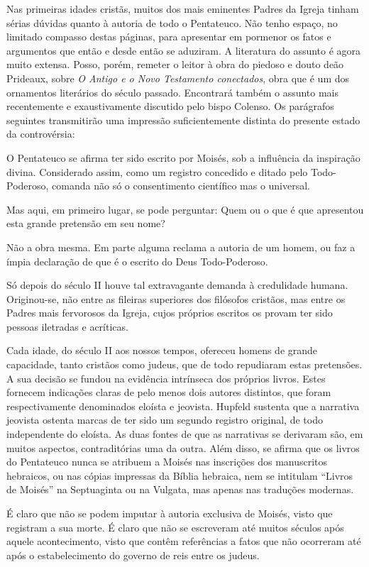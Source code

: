 \documentclass[11pt,a5paper,twoside,openany]{book}
\begin{document}
Nas primeiras idades cristãs, muitos dos mais eminentes Padres da Igreja tinham sérias dúvidas quanto à autoria de todo o Pentateuco. Não tenho espaço, no limitado compasso destas páginas, para apresentar em pormenor os fatos e argumentos que então e desde então se aduziram. A literatura do assunto é agora muito extensa. Posso, porém, remeter o leitor à obra do piedoso e douto deão Prideaux, sobre \textit{O Antigo e o Novo Testamento conectados}, obra que é um dos ornamentos literários do século passado. Encontrará também o assunto mais recentemente e exaustivamente discutido pelo bispo Colenso. Os parágrafos seguintes transmitirão uma impressão suficientemente distinta do presente estado da controvérsia:

O Pentateuco se afirma ter sido escrito por Moisés, sob a influência da inspiração divina. Considerado assim, como um registro concedido e ditado pelo Todo-Poderoso, comanda não só o consentimento científico mas o universal.

Mas aqui, em primeiro lugar, se pode perguntar: Quem ou o que é que apresentou esta grande pretensão em seu nome?

Não a obra mesma. Em parte alguma reclama a autoria de um homem, ou faz a ímpia declaração de que é o escrito do Deus Todo-Poderoso.

Só depois do século II houve tal extravagante demanda à credulidade humana. Originou-se, não entre as fileiras superiores dos filósofos cristãos, mas entre os Padres mais fervorosos da Igreja, cujos próprios escritos os provam ter sido pessoas iletradas e acríticas.

Cada idade, do século II aos nossos tempos, ofereceu homens de grande capacidade, tanto cristãos como judeus, que de todo repudiaram estas pretensões. A sua decisão se fundou na evidência intrínseca dos próprios livros. Estes fornecem indicações claras de pelo menos dois autores distintos, que foram respectivamente denominados eloísta e jeovista. Hupfeld sustenta que a narrativa jeovista ostenta marcas de ter sido um segundo registro original, de todo independente do eloísta. As duas fontes de que as narrativas se derivaram são, em muitos aspectos, contraditórias uma da outra. Além disso, se afirma que os livros do Pentateuco nunca se atribuem a Moisés nas inscrições dos manuscritos hebraicos, ou nas cópias impressas da Bíblia hebraica, nem se intitulam “Livros de Moisés” na Septuaginta ou na Vulgata, mas apenas nas traduções modernas.

É claro que não se podem imputar à autoria exclusiva de Moisés, visto que registram a sua morte. É claro que não se escreveram até muitos séculos após aquele acontecimento, visto que contêm referências a fatos que não ocorreram até após o estabelecimento do governo de reis entre os judeus.
\end{document}
